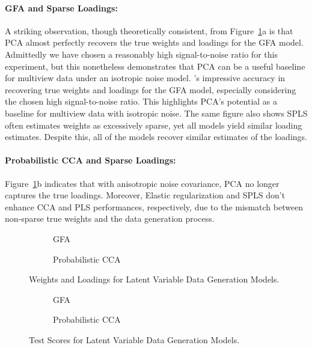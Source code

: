 \paragraph{GFA and Sparse Loadings:} A striking observation, though theoretically consistent, from Figure~\ref{fig:latent-variable-weights-loadings}a is that PCA almost perfectly recovers the true weights and loadings for the GFA model.
Admittedly we have chosen a reasonably high signal-to-noise ratio for this experiment, but this nonetheless demonstrates that PCA can be a useful baseline for multiview data under an isotropic noise model.
's impressive accuracy in recovering true weights and loadings for the GFA model, especially considering the chosen high signal-to-noise ratio.
This highlights PCA's potential as a baseline for multiview data with isotropic noise.
The same figure also shows SPLS often estimates weights as excessively sparse, yet all models yield similar loading estimates.
Despite this, all of the models recover similar estimates of the loadings.

\paragraph{Probabilistic CCA and Sparse Loadings:} Figure~\ref{fig:latent-variable-weights-loadings}b indicates that with anisotropic noise covariance, PCA no longer captures the true loadings.
Moreover, Elastic regularization and SPLS don't enhance CCA and PLS performances, respectively, due to the mismatch between non-sparse true weights and the data generation process.

\begin{figure}
\centering
\begin{subfigure}{0.49\linewidth}
\centering

\caption{GFA}
\end{subfigure}
%
\begin{subfigure}{0.49\linewidth}
\centering

\caption{Probabilistic CCA}
\end{subfigure}
\caption{Weights and Loadings for Latent Variable Data Generation Models.}\label{fig:latent-variable-weights-loadings}
\end{figure}

\begin{figure}
\centering
\begin{subfigure}{0.49\linewidth}
\centering

\caption{GFA}
\end{subfigure}
%
\begin{subfigure}{0.49\linewidth}
\centering

\caption{Probabilistic CCA}
\end{subfigure}
\caption{Test Scores for Latent Variable Data Generation Models.}\label{fig:latent-variable-scores}
\end{figure}

